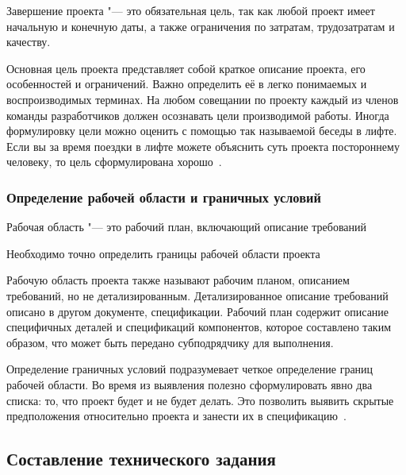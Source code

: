 \documentclass{../industrial-development}
\begin{document}
Завершение проекта "--- это обязательная цель, так как любой проект имеет начальную и конечную даты, а также ограничения по затратам, трудозатратам и качеству.

Основная цель проекта представляет собой краткое описание проекта, его особенностей и ограничений. Важно определить её в легко понимаемых и воспроизводимых терминах. На любом совещании по проекту каждый из членов команды разработчиков должен осознавать цели производимой работы. Иногда формулировку цели можно оценить с помощью так называемой беседы в лифте. Если вы за время поездки в лифте можете объяснить суть проекта постороннему человеку, то цель сформулирована хорошо~\cite[с.~244--247]{Fatrell}.

\begin{frame} \frametitle{Определение рабочей области и граничных условий}
  \begin{definition}
    Рабочая область "--- это рабочий план, включающий описание требований
  \end{definition}
  \begin{block}{}
    Необходимо точно определить границы рабочей области проекта
  \end{block}
\end{frame}

\lecturenotes

Рабочую область проекта также называют рабочим планом, описанием требований, но не детализированным. Детализированное описание требований описано в другом документе, спецификации. Рабочий план содержит описание специфичных деталей и спецификаций компонентов, которое составлено таким образом, что может быть передано субподрядчику для выполнения.

Определение граничных условий подразумевает четкое определение границ рабочей области. Во время из выявления полезно сформулировать явно два списка: то, что проект будет и не будет делать. Это позволить выявить скрытые предположения относительно проекта и занести их в спецификацию~\cite[с.~250--250]{Fatrell}.

\subsection{Составление технического задания}
\end{document}
